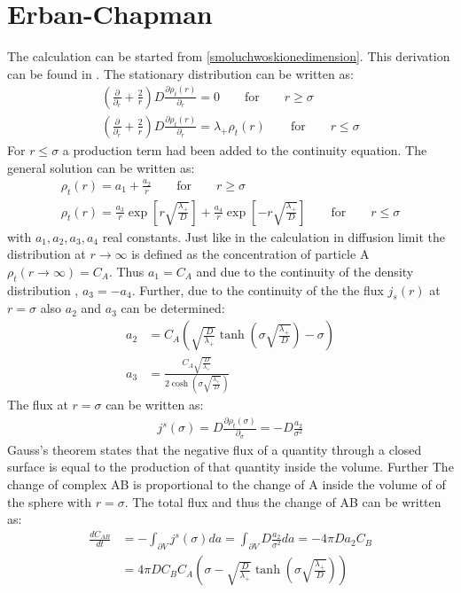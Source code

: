 \documentclass[
  a4paper,BCOR10mm,twoside,
  headsepline,footsepline,%
  fleqn,openbib
]{scrbook}
\begin{document}
\section{Erban-Chapman}\label{Erban-Chapmann}
The calculation can be started from \cref{smoluchwoskionedimension}. This derivation can be found in \cite{Erban2009}. The stationary distribution can be written as:
\begin{align}
\left(\frac{\partial}{\partial_r}+\frac{2}{r} \right) D \frac{\partial\rho_t(r)}{\partial_r}=0 \qquad \text{for} \qquad r \geq \sigma \\
\left(\frac{\partial}{\partial_r}+\frac{2}{r} \right) D \frac{\partial\rho_t(r)}{\partial_r}=\lambda_{+} \rho_t(r)  \qquad \text{for} \qquad r \leq \sigma
\end{align}
For  $r \leq \sigma$ a production term had been added to the continuity equation. The general solution can be written as: 
\begin{align}
\rho_t(r)= a_1+\frac{a_2}{r} \qquad \text{for} \qquad r \geq \sigma \label{erbanchapmanradial1} \\
\rho_t(r)= \frac{a_3}{r} \exp \left[ r \sqrt{\frac{\lambda_{+}}{D}} \right] + \frac{a_4}{r} \exp \left[-r \sqrt{\frac{\lambda_{+}}{D}} \right] \qquad\text{for}\qquad r \leq \sigma \label{erbanchapmanradial}
\end{align}
with $a_1, a_2, a_3, a_4$ real constants. Just like in the calculation in diffusion limit the distribution at  $r \rightarrow \infty$ is defined as the concentration of particle A $\rho_t(r \rightarrow \infty)=C_A$. Thus $a_1=C_A$ and due to the continuity of the density distribution , $a_3=-a_4$. Further, due to the continuity of the the flux $j_s(r)$ at $r=\sigma$ also $a_2$ and $a_3$ can be determined:
\begin{align}
 a_2&= C_A \left( \sqrt{\frac{D}{\lambda_{+}}} \tanh\left(\sigma \sqrt{\frac{\lambda_{+}}{D}}\right)-\sigma\right)  \\
 a_3&= \frac{C_A  \sqrt{\frac{D}{\lambda_{+}}}}{2 \cosh\left(\sigma \sqrt{\frac{\lambda_{+}}{D}}\right)}
\end{align}
The flux at  $r= \sigma$ can be written as:
\begin{align}
j^{s}(\sigma)=D \frac{\partial\rho_t(\sigma)}{\partial_{\sigma}}= -D \frac{a_2}{\sigma^2} 
\end{align}
Gauss's theorem states that the negative flux of a quantity through a closed surface is equal to the production of that quantity inside the volume. Further The change of complex AB is proportional to the change of A inside the volume of of the sphere with $r=\sigma$. The total flux and thus the change of AB can be written as:
\begin{align}
  \frac{d C_{AB} }{dt}&=- \int_{\partial V} j^{s}(\sigma) da= \int_{\partial V} D \frac{a_2} {\sigma^2}  da =- 4 \pi D a_2 C_B \\ &= 4 \pi D C_B  C_A \left(\sigma -\sqrt{\frac{D}{\lambda_{+}}} \tanh\left(\sigma \sqrt{\frac{\lambda_{+}}{D}}\right)\right)
\end{align}
\end{document}
